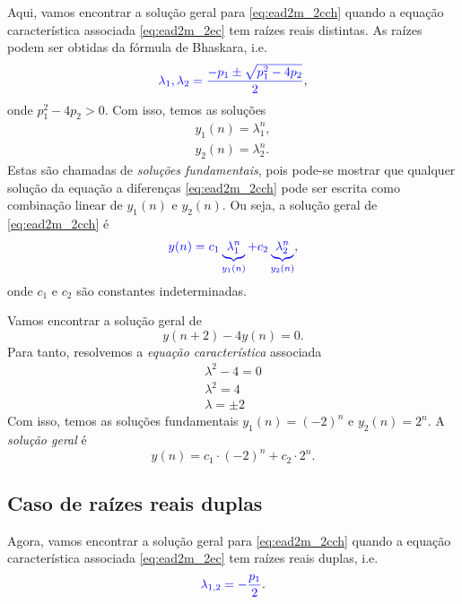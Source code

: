 Aqui, vamos encontrar a solução geral para \eqref{eq:ead2m_2cch} quando a equação característica associada \eqref{eq:ead2m_2ec} tem raízes reais distintas. As raízes podem ser obtidas da fórmula de Bhaskara, i.e.
\begin{equation}
  {\color{blue}\lambda_1,\lambda_2 = \frac{-p_1 \pm \sqrt{p_1^2-4p_2}}{2}},
\end{equation}
onde $p_1^2 - 4p_2 > 0$. Com isso, temos as soluções
\begin{gather}
  y_1(n) = \lambda_1^n,\\
  y_2(n) = \lambda_2^n.
\end{gather}
Estas são chamadas de \emph{soluções fundamentais}, pois pode-se mostrar que qualquer solução da equação a diferenças \eqref{eq:ead2m_2cch} pode ser escrita como combinação linear de $y_1(n)$ e $y_2(n)$. Ou seja, a solução geral de \eqref{eq:ead2m_2cch} é
\begin{equation}
  {\color{blue}y(n) = c_1\underbrace{\,\lambda_1^n\,}_{y_1(n)} + c_2\underbrace{\,\lambda_2^n\,}_{y_2(n)}},
\end{equation}
onde $c_1$ e $c_2$ são constantes indeterminadas.

\begin{ex}
  Vamos encontrar a solução geral de
  \begin{equation}
    y(n+2) - 4y(n) = 0.
  \end{equation}
  Para tanto, resolvemos a \emph{equação característica} associada
  \begin{gather}
    \lambda^2 - 4 = 0\\
    \lambda^2 = 4\\
    \lambda = \pm 2
  \end{gather}
  Com isso, temos as soluções fundamentais $y_1(n)=(-2)^n$ e $y_2(n)=2^n$. A \emph{solução geral} é
  \begin{equation}
    y(n) = c_1\cdot (-2)^n + c_2\cdot 2^n.
  \end{equation}
\end{ex}

\subsection{Caso de raízes reais duplas}

Agora, vamos encontrar a solução geral para \eqref{eq:ead2m_2cch} quando a equação característica associada \eqref{eq:ead2m_2ec} tem raízes reais duplas, i.e.
\begin{equation}
  {\color{blue}\lambda_{1,2} = -\frac{p_1}{2}}.
\end{equation}

